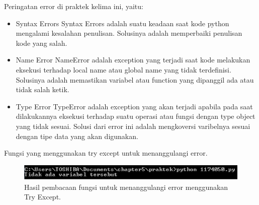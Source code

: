 \hfill \break
Peringatan error di praktek kelima ini, yaitu:
\begin{itemize}
	\item Syntax Errors
	Syntax Errors adalah suatu keadaan saat kode python mengalami kesalahan penulisan. Solusinya adalah memperbaiki penulisan kode yang salah.
	
	\item Name Error
	NameError adalah exception yang terjadi saat kode melakukan eksekusi terhadap local name atau global name yang tidak terdefinisi. Solusinya adalah memastikan variabel atau function yang dipanggil ada atau tidak salah ketik.
	
	\item Type Error
	TypeError adalah exception yang akan terjadi apabila pada saat dilakukannya eksekusi terhadap suatu operasi atau fungsi dengan type object yang tidak sesuai. Solusi dari error ini adalah mengkoversi varibelnya sesuai dengan tipe data yang akan digunakan.
\end{itemize}

\hfill \break
Fungsi yang menggunakan try except untuk menanggulangi error.



\begin{figure}[H]
	\includegraphics[width=12cm]{figures/5/1174034/Praktek/5.PNG}
	\centering
	\caption{Hasil pembacaan fungsi untuk menanggulangi error menggunakan Try Except.}
\end{figure}